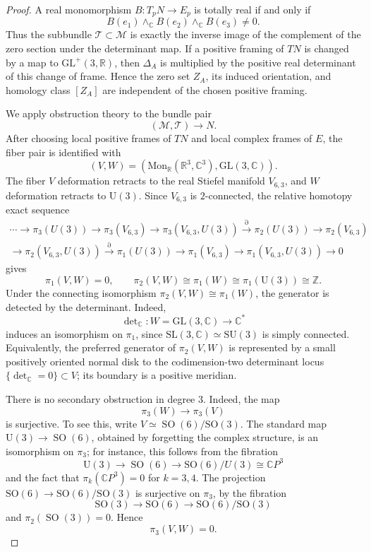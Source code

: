 \documentclass[10pt,a4paper]{amsart}
\newcommand{\C}{\mathbb{C}}
\newcommand{\Gl}{{\mathrm{GL}}}
\newcommand\Mon{\mathrm{Mon}}
\newcommand{\R}{\mathbb{R}}
\newcommand{\Sl}{{\mathrm{SL}}}
\newcommand{\So}{{\mathrm{SO}}}
\newcommand{\Su}{{\mathrm{SU}}}
\newcommand{\U}{{\mathrm{U}}}
\newcommand{\Z}{\mathbb{Z}}
\newcommand{\cM}{\mathcal{M}}
\newcommand{\cT}{\mathcal{T}}
\begin{document}
\begin{proof}
A real monomorphism \(B:T_pN\to E_p\) is totally real if and only if 
\[B(e_1)\wedge_{\C}B(e_2)\wedge_{\C}B(e_3)\ne 0.\] 
Thus the subbundle \(\cT\subset \cM\) is exactly the inverse image of the complement of the zero section under the determinant map. If a positive framing of $TN$ is changed by a map to $\Gl^+(3,\R)$, then $\Delta_A$ is multiplied by the positive real determinant of this change of frame. Hence the zero set $Z_A$, its induced orientation, and homology class $[Z_A]$ 
are independent of the chosen positive framing.

We apply obstruction theory to the bundle pair
\[(\cM,\cT)\longrightarrow N.\]
After choosing local positive frames of $TN$ and local complex frames of $E$, the fiber pair is identified with 
\[(V,W)=\left(\Mon_{\R}(\R^3,\C^3),\Gl(3,\C)\right).\]
The fiber $V$ deformation retracts to the real Stiefel manifold $V_{6,3}$, and $W$ deformation retracts to $\U(3)$. 
Since $V_{6,3}$ is $2$-connected, the relative homotopy exact sequence 
\begin{equation*}	
\begin{split}	
\cdots \longrightarrow
\pi_3(U(3))
\longrightarrow
\pi_3(V_{6,3})
\longrightarrow
\pi_3(V_{6,3},U(3))
\overset{\partial}{\longrightarrow}
\pi_2(U(3))
\longrightarrow
\pi_2(V_{6,3})\\
\longrightarrow
\pi_2(V_{6,3},U(3))
\overset{\partial}{\longrightarrow}
\pi_1(U(3))
\longrightarrow
\pi_1(V_{6,3})
\longrightarrow
\pi_1(V_{6,3},U(3))
\longrightarrow
0
\end{split}
\end{equation*}
gives
\[\pi_1(V,W)=0, \qquad \pi_2(V,W)\cong \pi_1(W)\cong \pi_1(\U(3))\cong \Z.\]
Under the connecting isomorphism $\pi_2(V,W)\cong \pi_1(W)$, the generator is detected by the determinant. Indeed,
\[\det\nolimits_{\C}:W=\Gl(3,\C)\longrightarrow \C^*\]
induces an isomorphism on $\pi_1$, since $\Sl (3,\C)\simeq \Su(3)$ is simply connected. Equivalently, the preferred generator of \(\pi_2(V,W)\) is represented by a small positively oriented normal disk to the codimension-two determinant locus $\{\det\nolimits_{\C}=0\}\subset V$; its boundary is a positive meridian.

There is no secondary obstruction in degree $3$. Indeed, the map 
\[\pi_3(W)\longrightarrow \pi_3(V)\]
is surjective. To see this, write $V\simeq \operatorname{SO}(6)/\So(3)$. The standard map $\U(3)\to \operatorname{SO}(6)$, obtained by forgetting the complex structure, is an isomorphism on $\pi_3$; for instance, this follows from the fibration
\[\U(3)\longrightarrow \operatorname{SO}(6)\longrightarrow \So(6)/U(3)
        \cong \C P^3\]
and the fact that $\pi_k(\mathbb{C}P^3)=0$ for $k=3,4$. The projection $\So(6)\to \So(6)/\So(3)$ is surjective on $\pi_3$, by the fibration
\[\So(3)\longrightarrow \So(6)\longrightarrow \So(6)/\So(3)\]
and $\pi_2(\operatorname{SO}(3))=0$. Hence
\[\pi_3(V,W)=0 .\]


\end{proof}
\end{document}
